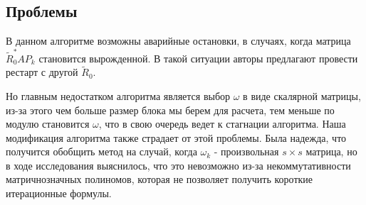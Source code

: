 \subsection{Проблемы}
\par В данном алгоритме возможны аварийные остановки, в случаях, когда матрица $\tilde{R}_0^*AP_k$ становится
вырожденной. В такой ситуации авторы \cite{elGuennouni2003} предлагают провести рестарт с другой $\tilde{R}_0$.
\par Но главным недостатком алгоритма \cite{elGuennouni2003} является выбор $\omega$
в виде скалярной матрицы, из-за этого чем больше размер блока мы берем
для расчета, тем меньше по модулю становится $\omega$, что в свою очередь ведет к стагнации алгоритма.
Наша модификация алгоритма также страдает от этой проблемы. Была надежда, что 
получится обобщить метод на случай, когда $\omega_k$ - произвольная $s \times s$ 
матрица, но в ходе исследования выяснилось, что это невозможно из-за некоммутативности 
матричнозначных полиномов, которая не позволяет получить короткие итерационные формулы.  

\newpage
